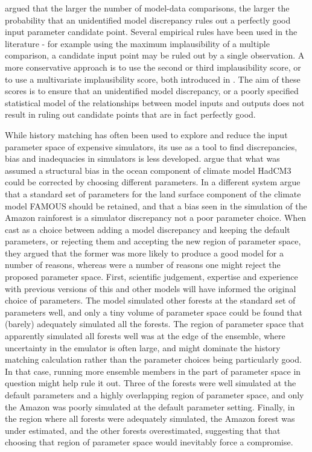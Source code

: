 \documentclass[gmd, manuscript]{copernicus}
\begin{document}
 \cite{mcneall2016impact} argued that the larger the number of model-data comparisons, the larger the probability that an unidentified model discrepancy rules out a perfectly good input parameter candidate point. Several empirical rules have been used in the literature - for example using the maximum implausibility of a multiple comparison, a candidate input point may be ruled out by a single observation. A more conservative approach is to use the second or third implausibility score, or to use a multivariate implausibility score, both introduced in \cite{vernon2010galaxy}. The aim of these scores is to ensure that an unidentified model discrepancy, or a poorly specified statistical model of the relationships between model inputs and outputs does not result in ruling out candidate points that are in fact perfectly good.   

While history matching has often been used to explore and reduce the input parameter space of expensive simulators, its use as a tool to find discrepancies, bias and inadequacies in simulators is less developed. \cite{williamson2015identifying} argue that what was assumed a structural bias in the ocean component of climate model HadCM3 could be corrected by choosing different parameters. In a different system \cite{mcneall2016impact} argue that a standard set of parameters for the land surface component of the climate model FAMOUS should be retained, and that a bias seen in the simulation of the Amazon rainforest is a simulator discrepancy not a poor parameter choice. When cast as a choice between adding a model discrepancy and keeping the default parameters, or rejecting them and accepting the new region of parameter space, they argued that the former was more likely to produce a good model for a number of reasons, whereas were a number of reasons one might reject the proposed parameter space. First, scientific judgement, expertise and experience with previous versions of this and other models will have informed the original choice of parameters. The model simulated other forests at the standard set of parameters well, and only a tiny volume of parameter space could be found that (barely) adequately simulated all the forests.  The region of parameter space that apparently simulated all forests well was at the edge of the ensemble, where uncertainty in the emulator is often large, and might dominate the history matching calculation rather than the parameter choices being particularly good. In that case, running more ensemble members in the part of parameter space in question might help rule it out. Three of the forests were well simulated at the default parameters and a highly overlapping region of parameter space, and only the Amazon was poorly simulated at the default parameter setting. Finally, in the region where all forests were adequately simulated, the Amazon forest was under estimated, and the other forests overestimated, suggesting that that choosing that region of parameter space would inevitably force a compromise. 
\end{document}
